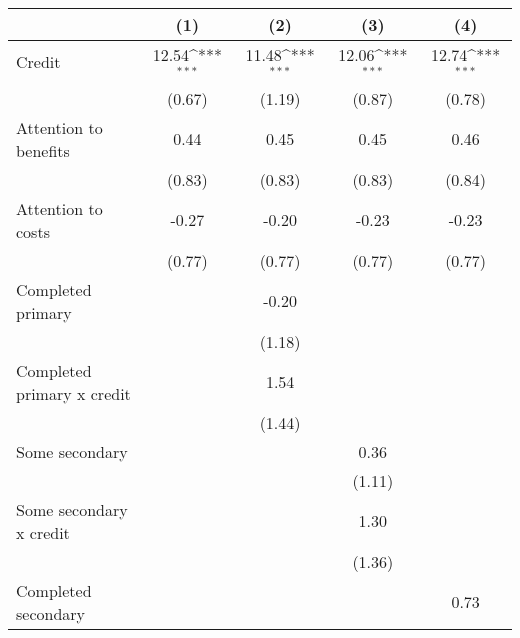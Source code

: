 {
\def\sym#1{\ifmmode^{#1}\else\(^{#1}\)\fi}
\begin{tabular}{l*{4}{c}}
\hline\hline
                    &\multicolumn{1}{c}{(1)}         &\multicolumn{1}{c}{(2)}         &\multicolumn{1}{c}{(3)}         &\multicolumn{1}{c}{(4)}         \\
\hline
Credit              &       12.54\sym{***}&       11.48\sym{***}&       12.06\sym{***}&       12.74\sym{***}\\
                    &      (0.67)         &      (1.19)         &      (0.87)         &      (0.78)         \\
[1em]
Attention to benefits&        0.44         &        0.45         &        0.45         &        0.46         \\
                    &      (0.83)         &      (0.83)         &      (0.83)         &      (0.84)         \\
[1em]
Attention to costs  &       -0.27         &       -0.20         &       -0.23         &       -0.23         \\
                    &      (0.77)         &      (0.77)         &      (0.77)         &      (0.77)         \\
[1em]
Completed primary   &                     &       -0.20         &                     &                     \\
                    &                     &      (1.18)         &                     &                     \\
[1em]
Completed primary x credit&                     &        1.54         &                     &                     \\
                    &                     &      (1.44)         &                     &                     \\
[1em]
Some secondary      &                     &                     &        0.36         &                     \\
                    &                     &                     &      (1.11)         &                     \\
[1em]
Some secondary x credit&                     &                     &        1.30         &                     \\
                    &                     &                     &      (1.36)         &                     \\
[1em]
Completed secondary &                     &                     &                     &        0.73         \\

\end{tabular}}
